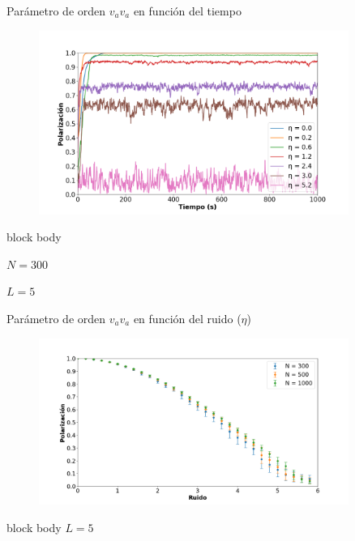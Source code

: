 \documentclass{beamer}
\begin{document}
            \begin{frame}{Parámetro de orden $v_a$}{$v_a$ en función del tiempo}
                    \begin{figure}[H!]
                        \includegraphics[width=0.9\textwidth]{./va_vs_time-n300}
                        \label{fig:va_4}
                    \end{figure}
                    \begin{beamercolorbox}[sep=5pt,center]{block body}
                        \begin{minipage}[t]{0.45\textwidth}
                            \centering
                            \small{$N=300$}
                        \end{minipage}
                        \hfill
                        \begin{minipage}[t]{0.45\textwidth}
                            \centering
                            \small{$L=5$}
                        \end{minipage}
                    \end{beamercolorbox}
            \end{frame}

            \begin{frame}{Parámetro de orden $v_a$}{$v_a$ en función del ruido ($\eta$)}
                \begin{figure}[H!]
                    \includegraphics[width=0.9\textwidth]{./va_vs_eta}
                    \label{fig:va_5}
                \end{figure}
                \begin{beamercolorbox}[sep=5pt,center]{block body}
                    \small{$L=5$}
                \end{beamercolorbox}
            \end{frame}
\end{document}
